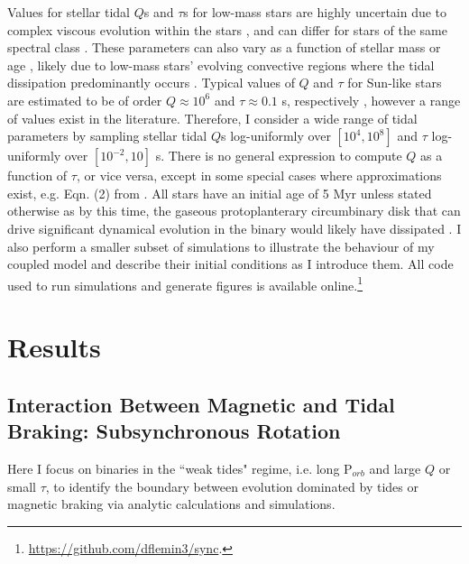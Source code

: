 Values for stellar tidal $Q$s and $\tau$s for low-mass stars are highly uncertain due to complex viscous evolution within the stars \citep{Ogilvie2007}, and can differ for stars of the same spectral class \citep{Barker2009}. These parameters can also vary as a function of stellar mass or age \citep{Bolmont2016,vanEylen2016}, likely due to low-mass stars' evolving convective regions where the tidal dissipation predominantly occurs \citep{Zahn2008}. Typical values of $Q$ and $\tau$ for Sun-like stars are estimated to be of order $Q \approx 10^6$ and $\tau \approx 0.1$ s, respectively \citep[e.g.][]{Meibom2005,Ogilvie2007,Jackson2008}, however a range of values exist in the literature.  Therefore, I consider a wide range of tidal parameters by sampling stellar tidal $Q$s log-uniformly over $[10^4,10^8]$ and $\tau$ log-uniformly over $[10^{-2},10]$ s.  There is no general expression to compute $Q$ as a function of $\tau$, or vice versa, except in some special cases where approximations exist, e.g. Eqn. (2) from \citet{Heller2011}. All stars have an initial age of 5 Myr unless stated otherwise as by this time, the gaseous protoplanterary circumbinary disk that can drive significant dynamical evolution in the binary \citep[e.g.][]{Fleming2017} would likely have dissipated \citep{Haisch2001}. I also perform a smaller subset of simulations to illustrate the behaviour of my coupled model and describe their initial conditions as I introduce them. All code used to run simulations and generate figures is available online.\footnote{\href{https://github.com/dflemin3/sync}{https://github.com/dflemin3/sync}.}



\section{Results} \label{sync:sec:results}

\subsection{Interaction Between Magnetic and Tidal Braking: Subsynchronous Rotation} \label{sync:sec:eq}

Here I focus on binaries in the ``weak tides" regime, i.e. long P$_{orb}$ and large $Q$ or small $\tau$, to identify the boundary between evolution dominated by tides or magnetic braking via analytic calculations and simulations.  

